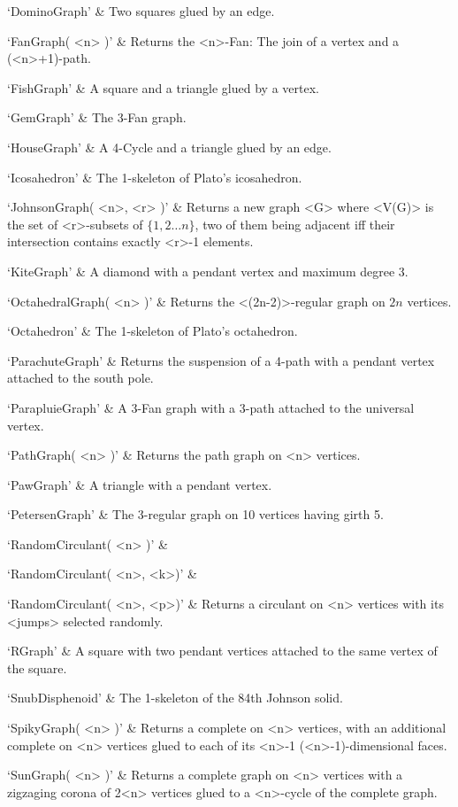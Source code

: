 `DominoGraph' & 
Two squares glued by an edge.

`FanGraph( <n> )' & 
Returns the <n>-Fan: The join of a vertex and a (<n>+1)-path.

`FishGraph' & 
A square and a triangle glued by a vertex.

`GemGraph' & 
The 3-Fan graph.

`HouseGraph' & 
A 4-Cycle and a triangle glued by an edge.

`Icosahedron' & 
The 1-skeleton of Plato's icosahedron.

`JohnsonGraph( <n>, <r> )' & 
Returns a new graph <G> where <V(G)> is the set of <r>-subsets of $\{1,2 \ldots n\}$, two of them being adjacent iff their intersection contains exactly <r>-1 elements.

`KiteGraph' & 
A diamond with a pendant vertex and maximum degree 3.

`OctahedralGraph( <n> )' & 
Returns the <(2n-2)>-regular graph on $2n$ vertices.

`Octahedron' & 
The 1-skeleton of Plato's octahedron.

`ParachuteGraph' & 
Returns the suspension of a 4-path with a pendant vertex attached to the south pole.

`ParapluieGraph' & 
A 3-Fan graph with a 3-path attached to the universal vertex.

`PathGraph( <n> )' & 
Returns the path graph on <n> vertices.

`PawGraph' & 
A triangle with a pendant vertex.

`PetersenGraph' & 
The 3-regular graph on 10 vertices having girth 5.

`RandomCirculant( <n> )' &

`RandomCirculant( <n>, <k>)' &

`RandomCirculant( <n>, <p>)' &
Returns a circulant on <n> vertices with its <jumps> selected randomly.

`RGraph' & 
A  square  with  two  pendant  vertices attached to the same vertex of the square.

`SnubDisphenoid' & 
The 1-skeleton of the 84th Johnson solid.

`SpikyGraph( <n> )' & 
Returns a complete on <n> vertices, with an additional complete on <n> vertices glued to each of its <n>-1
 (<n>-1)-dimensional faces.

`SunGraph( <n> )' & 
Returns a complete graph on <n> vertices with a zigzaging corona of 2<n> vertices glued to a <n>-cycle of the complete graph.

